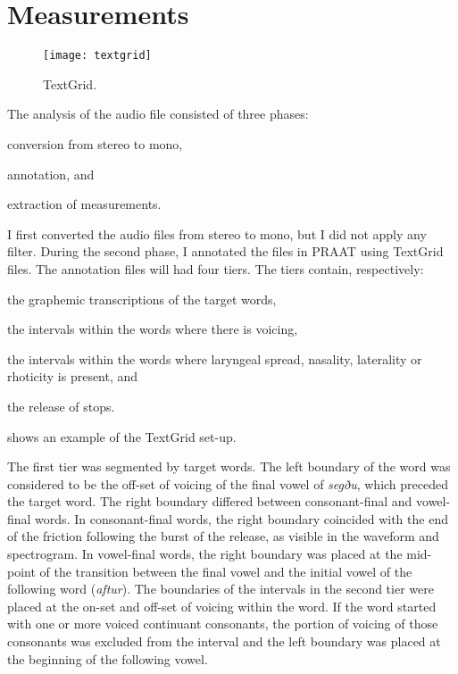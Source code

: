 \section{Measurements}

\begin{figure}
\centering
\texttt{[image: textgrid]}
\caption{TextGrid.}
\label{f:textgrid}
\end{figure}

The analysis of the audio file consisted of three phases:
\begin{inparaenum}[(1)]
	\item conversion from stereo to mono,
	\item annotation, and
	\item extraction of measurements.
\end{inparaenum}
I first converted the audio files from stereo to mono, but I did not apply any filter.
During the second phase, I annotated the files in PRAAT \citep{boersma2015} using TextGrid files.
The annotation files will had four tiers.
The tiers contain, respectively: 
\begin{inparaenum}[(1)]
	\item the graphemic transcriptions of the target words,
	\item the intervals within the words where there is voicing, 
	\item the intervals within the words where laryngeal spread, nasality, laterality or rhoticity is present, and
	\item the release of stops.
\end{inparaenum}
 shows an example of the TextGrid set-up.

The first tier was segmented by target words.
The left boundary of the word was considered to be the off-set of voicing of the final vowel of \textit{segðu}, which preceded the target word.
The right boundary differed between consonant-final and vowel-final words.
In consonant-final words, the right boundary coincided with the end of the friction following the burst of the release, as visible in the waveform and spectrogram.
In vowel-final words, the right boundary was placed at the mid-point of the transition between the final vowel and the initial vowel of the following word (\textit{aftur}).
The boundaries of the intervals in the second tier were placed at the on-set and off-set of voicing within the word.
If the word started with one or more voiced continuant consonants, the portion of voicing of those consonants was excluded from the interval and the left boundary was placed at the beginning of the following vowel.

